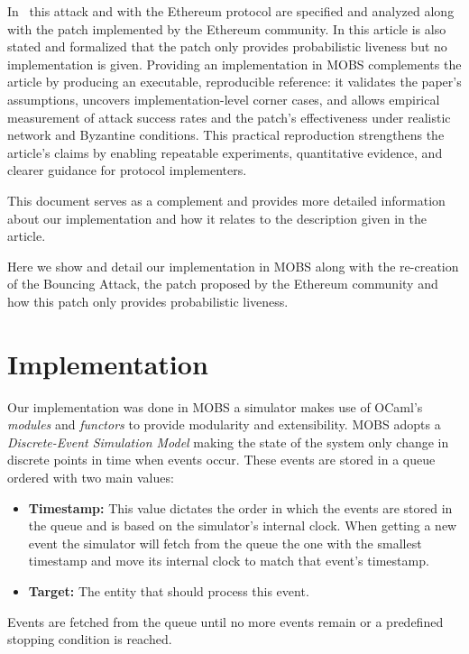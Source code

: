 \documentclass[11pt,a4paper]{article}
\begin{document}
In~\cite{ethereum_analysis} this attack and with the Ethereum protocol are specified and analyzed along with the patch
implemented by the Ethereum community. In this article is also stated and formalized that the patch only provides probabilistic
liveness but no implementation is given. Providing an implementation in MOBS complements the article by producing an
executable, reproducible reference: it validates the paper's assumptions, uncovers implementation-level corner cases, and
allows empirical measurement of attack success rates and the patch's effectiveness under realistic network and Byzantine
conditions. This practical reproduction strengthens the article's claims by enabling repeatable experiments, quantitative
evidence, and clearer guidance for protocol implementers.

This document serves as a complement and provides more detailed information about our implementation and how it relates to the description given in the article.

Here we show and detail our implementation in MOBS along with the re-creation of the Bouncing Attack, the patch proposed by the Ethereum
community and how this patch only provides probabilistic liveness.


\section{Implementation}

Our implementation was done in MOBS a simulator makes use of OCaml's \textit{modules} and \textit{functors} to
provide modularity and extensibility. MOBS adopts a \textit{Discrete-Event Simulation Model}
making the state of the system only change in discrete points in time when events occur.
These events are stored in a queue ordered with two main values:
\begin{itemize}
  \item \textbf{Timestamp:} This value dictates the order in which the events are
stored in the queue and is based on the simulator's internal clock. When getting
a new event the simulator will fetch from the queue the one with the smallest timestamp
and move its internal clock to match that event's timestamp.
  \item \textbf{Target:} The entity that should process this event.
\end{itemize}
Events are fetched from the queue until no more events remain or a predefined
stopping condition is reached.
\end{document}
